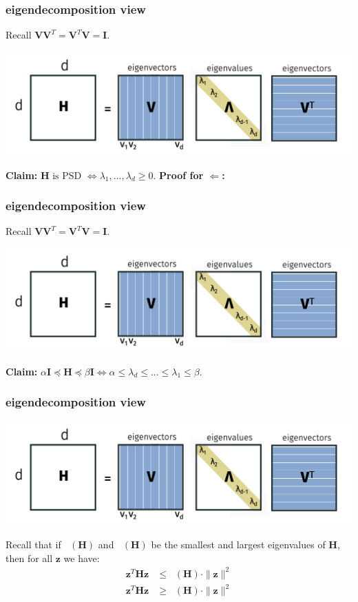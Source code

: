 \documentclass[compress]{beamer}
\newcommand{\bv}[1]{\mathbf{#1}}
\DeclareMathOperator*{\lmin}{\lambda_{min}}
\DeclareMathOperator*{\lmax}{\lambda_{max}}
\begin{document}
\begin{frame}[t]
	\frametitle{eigendecomposition view}
	Recall $\bv{V}\bv{V}^T = \bv{V}^T\bv{V} = \bv{I}$.
	\begin{center}
		\includegraphics[width=.9\textwidth]{eigendecomp.png}
	\end{center}
	\textbf{Claim:}	$\bv{H} \text{ is PSD } \Leftrightarrow \lambda_1, ..., \lambda_d \geq 0$. \textbf{Proof for $\Leftarrow$:}
\end{frame}

\begin{frame}[t]
	\frametitle{eigendecomposition view}
	Recall $\bv{V}\bv{V}^T = \bv{V}^T\bv{V} = \bv{I}$.
	\begin{center}
		\includegraphics[width=.9\textwidth]{eigendecomp.png}
	\end{center}
	\textbf{Claim:}	$\alpha\bv{I} \preceq \bv{H} \preceq \beta \bv{I} \Leftrightarrow \alpha \leq \lambda_d \leq ... \leq \lambda_1 \leq \beta$. 
\end{frame}

\begin{frame}[t]
	\frametitle{eigendecomposition view}
	\vspace{-1em}
	\begin{center}
		\includegraphics[width=.9\textwidth]{eigendecomp.png}
	\end{center}\vspace{-1.5em}

	Recall that if $\lmax(\bv{H})$ and $\lmin(\bv{H})$ be the smallest and largest eigenvalues of $\bv{H}$, then for all $\bv{z}$ we have: 
	\begin{align*}
		\bv{z}^T\bv{H}\bv{z} &\leq \lmax(\bv{H})\cdot \|\bv{z}\|^2 \\
		\bv{z}^T\bv{H}\bv{z} &\geq \lmin(\bv{H})\cdot \|\bv{z}\|^2 
	\end{align*}
	
\end{frame}
\end{document}
